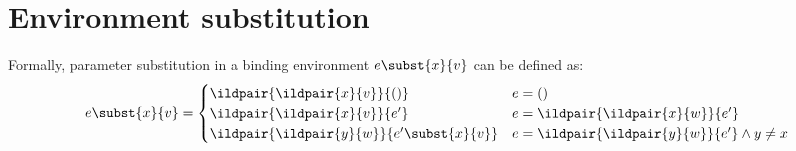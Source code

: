 \section{Environment substitution}
\label{env-substitution}

Formally, parameter substitution in a binding environment $e\subst{x}{v}$ can be defined as:
\[
  e \subst{x}{v} =
  \begin{cases}
    \ildpair{\ildpair{x}{v}}{()} & e = () \\
    \ildpair{\ildpair{x}{v}}{e'} & e = \ildpair{\ildpair{x}{w}}{e'} \\
    \ildpair{\ildpair{y}{w}}{e' \subst{x}{v}} & e = \ildpair{\ildpair{y}{w}}{e'} \land y \neq x
  \end{cases}
\]
